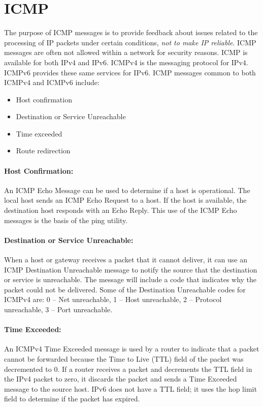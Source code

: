 \section{ICMP}

The purpose of ICMP messages is to provide feedback about issues related to the processing of IP packets under certain conditions, \emph{not to make IP reliable}. ICMP messages are often not allowed within a network for security reasons. ICMP is available for both IPv4 and IPv6. ICMPv4 is the messaging protocol for IPv4. ICMPv6 provides these same services for IPv6. ICMP messages common to both ICMPv4 and ICMPv6 include:

\begin{itemize}
\item Host confirmation
\item Destination or Service Unreachable
\item Time exceeded
\item Route redirection
\end{itemize}

\paragraph{Host Confirmation:}An ICMP Echo Message can be used to determine if a host is operational. The local host sends an ICMP Echo Request to a host. If the host is available, the destination host responds with an Echo Reply. This use of the ICMP Echo messages is the basis of the ping utility. 

\paragraph{Destination or Service Unreachable:} When a host or gateway receives a packet that it cannot deliver, it can use an ICMP Destination Unreachable message to notify the source that the destination or service is unreachable. The message will include a code that indicates why the packet could not be delivered. Some of the Destination Unreachable codes for ICMPv4 are: 0 -- Net unreachable, 1 -- Host unreachable, 2 -- Protocol unreachable, 3 -- Port unreachable.

\paragraph{Time Exceeded:} An ICMPv4 Time Exceeded message is used by a router to indicate that a packet cannot be forwarded because the Time to Live (TTL) field of the packet was decremented to 0. If a router receives a packet and decrements the TTL field in the IPv4 packet to zero, it discards the packet and sends a Time Exceeded message to the source host. IPv6 does not have a TTL field; it uses the hop limit field to determine if the packet has expired.

